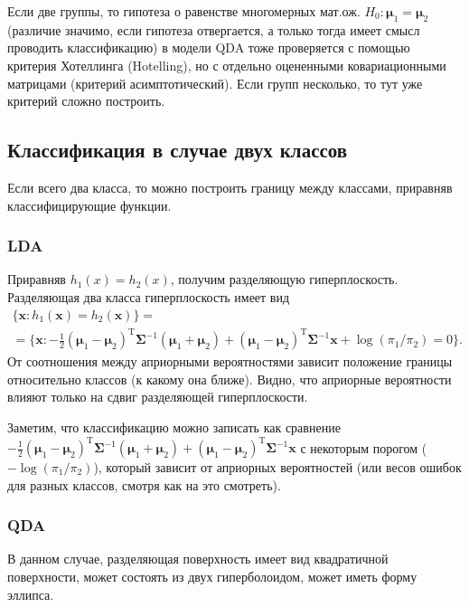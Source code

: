 \begin{note}
  Если две группы, то гипотеза о равенстве многомерных мат.ож. $H_0: \bm{\mu}_1 = \bm{\mu}_2$ (различие значимо, если гипотеза отвергается, а только тогда имеет смысл проводить классификацию) в модели QDA тоже проверяется с помощью критерия Хотеллинга (Hotelling), но с отдельно оцененными ковариационными матрицами (критерий асимптотический). Если групп несколько, то тут уже критерий сложно построить.
\end{note}

\subsection{Классификация в случае двух классов}
Если всего два класса, то можно построить границу между классами, приравняв классифицирующие функции.
\subsubsection{LDA} %
Приравняв $h_1(x)= h_2(x)$, получим разделяющую гиперплоскость.
Разделяющая два класса гиперплоскость имеет вид
\begin{multline*}
  \{\mathbf{x} : h_1(\mathbf{x}) = h_2(\mathbf{x})\} =\\ = \{\mathbf{x} : -\frac{1}{2} (\bm{\mu}_1 - \bm{\mu}_2)^\mathrm{T} \mathbf{\bm{\Sigma}}^{-1}(\bm{\mu}_1 + \bm{\mu}_2) + (\bm{\mu}_1 - \bm{\mu}_2)^\mathrm{T} \mathbf{\bm{\Sigma}}^{-1}\mathbf{x} + \log(\pi_1/\pi_2) = 0\}.
\end{multline*}
От соотношения между априорными вероятностями зависит положение границы относительно классов (к какому она ближе).
Видно, что априорные вероятности влияют только на сдвиг разделяющей гиперплоскости.

Заметим, что классификацию можно записать как сравнение $-\frac{1}{2} (\bm{\mu}_1 - \bm{\mu}_2)^\mathrm{T} \mathbf{\bm{\Sigma}}^{-1}(\bm{\mu}_1 + \bm{\mu}_2) + (\bm{\mu}_1 - \bm{\mu}_2)^\mathrm{T} \mathbf{\bm{\Sigma}}^{-1}\mathbf{x}$ с некоторым порогом ($-\log(\pi_1/\pi_2)$), который зависит от априорных вероятностей
(или весов ошибок для разных классов, смотря как на это смотреть).

\subsubsection{QDA} %
	В данном случае, разделяющая поверхность имеет вид квадратичной поверхности, может состоять из двух гиперболоидом,
может иметь форму эллипса.

